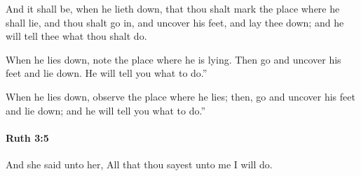 			\begin{versebox}
					\item[BHS] 
					\item[LXX] 
					\item[ASV] And it shall be, when he lieth down, that thou shalt mark the place where he shall lie, and thou shalt go in, and uncover his feet, and lay thee down; and he will tell thee what thou shalt do.
					\item[NIV] When he lies down, note the place where he is lying. Then go and uncover his feet and lie down. He will tell you what to do.”
					\item[NRSV] When he lies down, observe the place where he lies; then, go and uncover his feet and lie down; and he will tell you what to do.”
			\end{versebox}

		\paragraph{Ruth 3:5} %
			\label{RUTH-3-5}

			And she said unto her, All that thou sayest unto me I will do.

